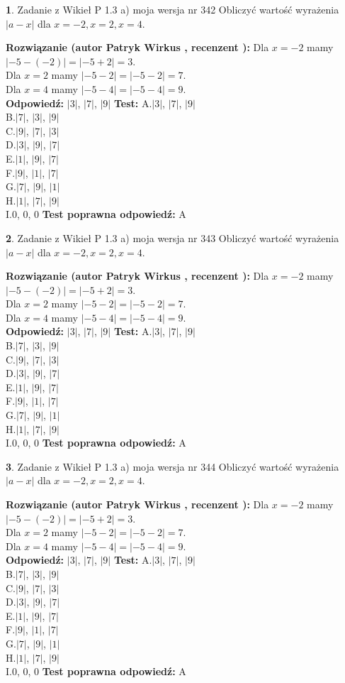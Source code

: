 \documentclass[12pt, a4paper]{article}
\theoremstyle{definition} %
\newtheorem{zad}{}
\newcommand{\zadStart}[1]{\begin{zad}#1\newline}
\newcommand{\zadStop}{\end{zad}}
\newcommand{\rozwStart}[2]{\noindent \textbf{Rozwiązanie (autor #1 , recenzent #2): }\newline}
\newcommand{\rozwStop}{\newline}
\newcommand{\odpStart}{\noindent \textbf{Odpowiedź:}\newline}
\newcommand{\odpStop}{\newline}
\newcommand{\testStart}{\noindent \textbf{Test:}\newline}
\newcommand{\testStop}{\newline}
\newcommand{\kluczStart}{\noindent \textbf{Test poprawna odpowiedź:}\newline}
\newcommand{\kluczStop}{\newline}
\begin{document}
\zadStart{Zadanie z Wikieł P 1.3 a) moja wersja nr 342}
Obliczyć wartość wyrażenia $|a - x|$ dla $x=-2,x=2,x=4$.
\zadStop
\rozwStart{Patryk Wirkus}{}
Dla $x = -2$ mamy $|-5 - (-2)| = |-5 + 2| = 3$.\\
Dla $x = 2$ mamy $|-5 - 2| = |-5 - 2| = 7$.\\
Dla $x = 4$ mamy $|-5 - 4| = |-5 - 4| = 9$.\\
\rozwStop
\odpStart
$|3|$, $|7|$, $|9|$
\odpStop
\testStart
A.$|3|$, $|7|$, $|9|$\\
B.$|7|$, $|3|$, $|9|$\\
C.$|9|$, $|7|$, $|3|$\\
D.$|3|$, $|9|$, $|7|$\\
E.$|1|$, $|9|$, $|7|$\\
F.$|9|$, $|1|$, $|7|$\\
G.$|7|$, $|9|$, $|1|$\\
H.$|1|$, $|7|$, $|9|$\\
I.$0$, $0$, $0$
\testStop
\kluczStart
A
\kluczStop



\zadStart{Zadanie z Wikieł P 1.3 a) moja wersja nr 343}
Obliczyć wartość wyrażenia $|a - x|$ dla $x=-2,x=2,x=4$.
\zadStop
\rozwStart{Patryk Wirkus}{}
Dla $x = -2$ mamy $|-5 - (-2)| = |-5 + 2| = 3$.\\
Dla $x = 2$ mamy $|-5 - 2| = |-5 - 2| = 7$.\\
Dla $x = 4$ mamy $|-5 - 4| = |-5 - 4| = 9$.\\
\rozwStop
\odpStart
$|3|$, $|7|$, $|9|$
\odpStop
\testStart
A.$|3|$, $|7|$, $|9|$\\
B.$|7|$, $|3|$, $|9|$\\
C.$|9|$, $|7|$, $|3|$\\
D.$|3|$, $|9|$, $|7|$\\
E.$|1|$, $|9|$, $|7|$\\
F.$|9|$, $|1|$, $|7|$\\
G.$|7|$, $|9|$, $|1|$\\
H.$|1|$, $|7|$, $|9|$\\
I.$0$, $0$, $0$
\testStop
\kluczStart
A
\kluczStop



\zadStart{Zadanie z Wikieł P 1.3 a) moja wersja nr 344}
Obliczyć wartość wyrażenia $|a - x|$ dla $x=-2,x=2,x=4$.
\zadStop
\rozwStart{Patryk Wirkus}{}
Dla $x = -2$ mamy $|-5 - (-2)| = |-5 + 2| = 3$.\\
Dla $x = 2$ mamy $|-5 - 2| = |-5 - 2| = 7$.\\
Dla $x = 4$ mamy $|-5 - 4| = |-5 - 4| = 9$.\\
\rozwStop
\odpStart
$|3|$, $|7|$, $|9|$
\odpStop
\testStart
A.$|3|$, $|7|$, $|9|$\\
B.$|7|$, $|3|$, $|9|$\\
C.$|9|$, $|7|$, $|3|$\\
D.$|3|$, $|9|$, $|7|$\\
E.$|1|$, $|9|$, $|7|$\\
F.$|9|$, $|1|$, $|7|$\\
G.$|7|$, $|9|$, $|1|$\\
H.$|1|$, $|7|$, $|9|$\\
I.$0$, $0$, $0$
\testStop
\kluczStart
A
\kluczStop
\end{document}

